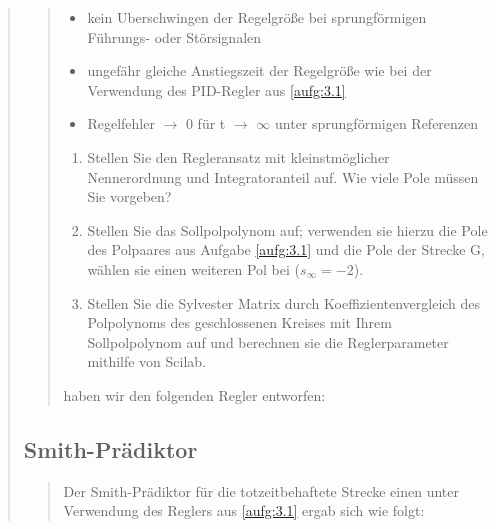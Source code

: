 \begin{quote}
\begin{quote}
        \begin{itemize}
            
            \item kein Uberschwingen der Regelgröße bei sprungförmigen Führungs- oder Störsignalen
            
            \item ungefähr gleiche Anstiegszeit der Regelgröße wie bei der Verwendung des PID-Regler aus
            \ref{aufg:3.1}
            
            \item Regelfehler $\to$ 0 für t $\to$ $\infty$ unter sprungförmigen Referenzen
        
        \end{itemize}
        \vspace{1em}
        
        \begin{enumerate}
            
            \item Stellen Sie den Regleransatz mit kleinstmöglicher Nennerordnung und Integratoranteil auf. Wie viele Pole
            müssen Sie vorgeben?\\
            
            \item Stellen Sie das Sollpolpolynom auf; verwenden sie hierzu die Pole des Polpaares aus Aufgabe \ref{aufg:3.1}
            und die Pole der Strecke G, wählen sie einen weiteren Pol bei ($s_\infty = -2$).\\
            
            \item Stellen Sie die Sylvester Matrix durch Koeffizientenvergleich des Polpolynoms des geschlossenen Kreises
            mit Ihrem Sollpolpolynom auf und berechnen sie die Reglerparameter mithilfe von Scilab.\\
        
        \end{enumerate}
        
        
        haben wir den folgenden Regler entworfen:
        
        
        
    \end{quote}
    
    
    
    \subsection{Smith-Prädiktor}
    \begin{quote}
        
        Der Smith-Prädiktor für die totzeitbehaftete Strecke einen unter Verwendung des Reglers aus \ref{aufg:3.1} ergab sich wie folgt:
        
        
    \end{quote}
    
\end{quote} %

